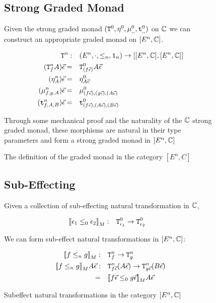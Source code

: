 \documentclass{Report}
\begin{document}
\begin{figure}
    \begin{framed}
        \subsection{Strong Graded Monad}
Given the strong graded monad $(\texttt{T}^0_{}, \eta_{}^0{}{}, \mu_{, , }^0, \texttt{t}_{, , }^0)$ on $\mathbb{C}$ we can construct an appropriate graded monad on $[E^n, \mathbb{C}]$.

\begin{align}
    \texttt{T}^n_{}:&\quad(E^n, \cdot, \leq_n, \texttt{1}_n) \rightarrow [[E^n, \mathbb{C}], [E^n, \mathbb{C}]]\\
    (\texttt{T}^n_{f}A)\vec{\epsilon}=&\quad \texttt{T}^0_{(f\vec{\epsilon})}A\vec{\epsilon}\\
    (\eta_{A}^n)\vec{\epsilon}=&\quad\eta_{A\vec{\epsilon}}^0\\
    (\mu_{f, g, A}^n)\vec{\epsilon}=&\quad\mu_{(f\vec{\epsilon}), (g\vec{\epsilon}), (A\vec{\epsilon})}^0\\
    (\texttt{t}_{f, A, B}^n)\vec{\epsilon}=&\quad\texttt{t}_{(f\vec{\epsilon}), (A\vec{\epsilon}), (B\vec{\epsilon})}^0
\end{align}

Through some mechanical proof and the naturality of the $\mathbb{C}$ strong graded monad, these morphisms are natural in their type parameters and form a strong graded monad in $[E^n, \mathbb{C}]$

    \end{framed}
    \caption{The definition of the graded monad in the category $[E^n, C]$}
    \label{HowToBuildMonad}
\end{figure}


\begin{figure}
    \begin{framed}
        
        \subsection{Sub-Effecting}
        Given a collection of sub-effecting natural transformation in $\mathbb{C}$,
        
        \begin{align}
            {\bf [\![}\epsilon_1\leq_0 \epsilon_2{\bf ]\!]}_M:&\quad \texttt{T}^0_{\epsilon_1} \rightarrow \texttt{T}^0_{\epsilon_2}
        \end{align}
        
        We can form sub-effect natural transformations in $[E^n, \mathbb{C}]$:
        
        \begin{align}
            {\bf [\![}f\leq_n g{\bf ]\!]}_M:&\quad\texttt{T}^n_{f}\rightarrow \texttt{T}^n_{g}\\
            {\bf [\![}f\leq_n g{\bf ]\!]}_M A \vec{\epsilon}:&\quad\texttt{T}^n_{f\vec{\epsilon}}(A\vec{\epsilon})\rightarrow \texttt{T}^n_{g\vec{\epsilon}}(B\vec{\epsilon})\\
            =&\quad {\bf [\![}f\vec{\epsilon}\leq_0 g\vec{\epsilon}{\bf ]\!]}_MA\vec{\epsilon}
        \end{align}
    \end{framed}
    \caption{Subeffect natural transformations in the category $[E^n, \mathbb{C}]$}
    \label{HowToBuildSubeffecting}
\end{figure}
\end{document}
